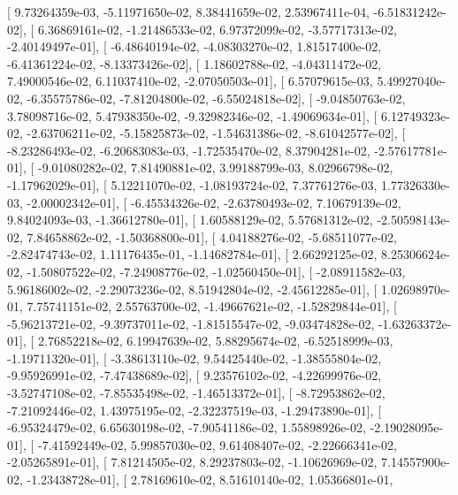 \documentclass{article}
\begin{document}
       [  9.73264359e-03,  -5.11971650e-02,   8.38441659e-02,
          2.53967411e-04,  -6.51831242e-02],
       [  6.36869161e-02,  -1.21486533e-02,   6.97372099e-02,
         -3.57717313e-02,  -2.40149497e-01],
       [ -6.48640194e-02,  -4.08303270e-02,   1.81517400e-02,
         -6.41361224e-02,  -8.13373426e-02],
       [  1.18602788e-02,  -4.04311472e-02,   7.49000546e-02,
          6.11037410e-02,  -2.07050503e-01],
       [  6.57079615e-03,   5.49927040e-02,  -6.35575786e-02,
         -7.81204800e-02,  -6.55024818e-02],
       [ -9.04850763e-02,   3.78098716e-02,   5.47938350e-02,
         -9.32982346e-02,  -1.49069634e-01],
       [  6.12749323e-02,  -2.63706211e-02,  -5.15825873e-02,
         -1.54631386e-02,  -8.61042577e-02],
       [ -8.23286493e-02,  -6.20683083e-03,  -1.72535470e-02,
          8.37904281e-02,  -2.57617781e-01],
       [ -9.01080282e-02,   7.81490881e-02,   3.99188799e-03,
          8.02966798e-02,  -1.17962029e-01],
       [  5.12211070e-02,  -1.08193724e-02,   7.37761276e-03,
          1.77326330e-03,  -2.00002342e-01],
       [ -6.45534326e-02,  -2.63780493e-02,   7.10679139e-02,
          9.84024093e-03,  -1.36612780e-01],
       [  1.60588129e-02,   5.57681312e-02,  -2.50598143e-02,
          7.84658862e-02,  -1.50368800e-01],
       [  4.04188276e-02,  -5.68511077e-02,  -2.82474743e-02,
          1.11176435e-01,  -1.14682784e-01],
       [  2.66292125e-02,   8.25306624e-02,  -1.50807522e-02,
         -7.24908776e-02,  -1.02560450e-01],
       [ -2.08911582e-03,   5.96186002e-02,  -2.29073236e-02,
          8.51942804e-02,  -2.45612285e-01],
       [  1.02698970e-01,   7.75741151e-02,   2.55763700e-02,
         -1.49667621e-02,  -1.52829844e-01],
       [ -5.96213721e-02,  -9.39737011e-02,  -1.81515547e-02,
         -9.03474828e-02,  -1.63263372e-01],
       [  2.76852218e-02,   6.19947639e-02,   5.88295674e-02,
         -6.52518999e-03,  -1.19711320e-01],
       [ -3.38613110e-02,   9.54425440e-02,  -1.38555804e-02,
         -9.95926991e-02,  -7.47438689e-02],
       [  9.23576102e-02,  -4.22699976e-02,  -3.52747108e-02,
         -7.85535498e-02,  -1.46513372e-01],
       [ -8.72953862e-02,  -7.21092446e-02,   1.43975195e-02,
         -2.32237519e-03,  -1.29473890e-01],
       [ -6.95324479e-02,   6.65630198e-02,  -7.90541186e-02,
          1.55898926e-02,  -2.19028095e-01],
       [ -7.41592449e-02,   5.99857030e-02,   9.61408407e-02,
         -2.22666341e-02,  -2.05265891e-01],
       [  7.81214505e-02,   8.29237803e-02,  -1.10626969e-02,
          7.14557900e-02,  -1.23438728e-01],
       [  2.78169610e-02,   8.51610140e-02,   1.05366801e-01,
\end{document}
